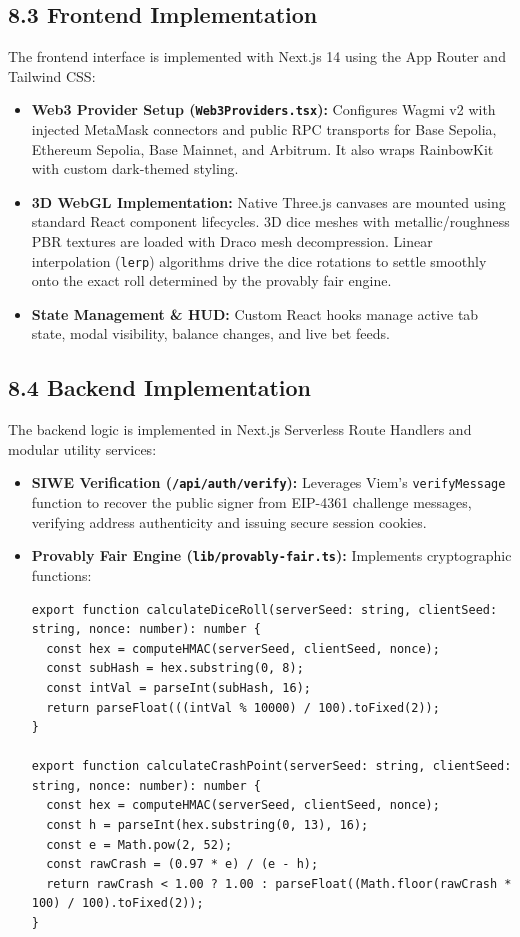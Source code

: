\subsection*{8.3 Frontend Implementation}
The frontend interface is implemented with Next.js 14 using the App Router and Tailwind CSS:
\begin{itemize}[leftmargin=1.5em]
    \item \textbf{Web3 Provider Setup (\texttt{Web3Providers.tsx}):} Configures Wagmi v2 with injected MetaMask connectors and public RPC transports for Base Sepolia, Ethereum Sepolia, Base Mainnet, and Arbitrum. It also wraps RainbowKit with custom dark-themed styling.
    \item \textbf{3D WebGL Implementation:} Native Three.js canvases are mounted using standard React component lifecycles. 3D dice meshes with metallic/roughness PBR textures are loaded with Draco mesh decompression. Linear interpolation (\texttt{lerp}) algorithms drive the dice rotations to settle smoothly onto the exact roll determined by the provably fair engine.
    \item \textbf{State Management \& HUD:} Custom React hooks manage active tab state, modal visibility, balance changes, and live bet feeds.
\end{itemize}

\subsection*{8.4 Backend Implementation}
The backend logic is implemented in Next.js Serverless Route Handlers and modular utility services:
\begin{itemize}[leftmargin=1.5em]
    \item \textbf{SIWE Verification (\texttt{/api/auth/verify}):} Leverages Viem's \texttt{verifyMessage} function to recover the public signer from EIP-4361 challenge messages, verifying address authenticity and issuing secure session cookies.
    \item \textbf{Provably Fair Engine (\texttt{lib/provably-fair.ts}):} Implements cryptographic functions:
\begin{lstlisting}[language=Solidity,caption={Provably Fair Implementation in lib/provably-fair.ts}]
export function calculateDiceRoll(serverSeed: string, clientSeed: string, nonce: number): number {
  const hex = computeHMAC(serverSeed, clientSeed, nonce);
  const subHash = hex.substring(0, 8);
  const intVal = parseInt(subHash, 16);
  return parseFloat(((intVal % 10000) / 100).toFixed(2));
}

export function calculateCrashPoint(serverSeed: string, clientSeed: string, nonce: number): number {
  const hex = computeHMAC(serverSeed, clientSeed, nonce);
  const h = parseInt(hex.substring(0, 13), 16);
  const e = Math.pow(2, 52);
  const rawCrash = (0.97 * e) / (e - h);
  return rawCrash < 1.00 ? 1.00 : parseFloat((Math.floor(rawCrash * 100) / 100).toFixed(2));
}
\end{lstlisting}
\end{itemize}

